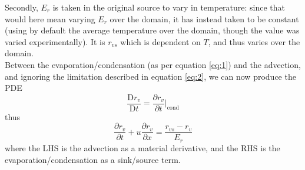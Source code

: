 \documentclass[11pt]{article}
\begin{document}
Secondly, $E_r$ is taken in the original source to vary in temperature: since that would here mean varying $E_r$ over the domain, it has instead taken to be constant (using by default the average temperature over the domain, though the value was varied experimentally). It is $r_{vs}$ which is dependent on $T$, and thus varies over the domain. \\
Between the evaporation/condensation (as per equation \ref{eq:1}) and the advection, and ignoring the limitation described in equation \ref{eq:2}, we can now produce the PDE
\[
\frac{\text{D} r_v}{\text{D} t}=\frac{\partial r_v}{\partial t}|_{\text{cond}}
\]
thus
\begin{equation}
\frac{\partial r_v}{\partial t}+u\frac{\partial r_v}{\partial x}=\frac{r_{vs} - r_v}{E_r} \label{eq:3}
\end{equation}
where the LHS is the advection as a material derivative, and the RHS is the evaporation/condensation as a sink/source term.
\end{document}
